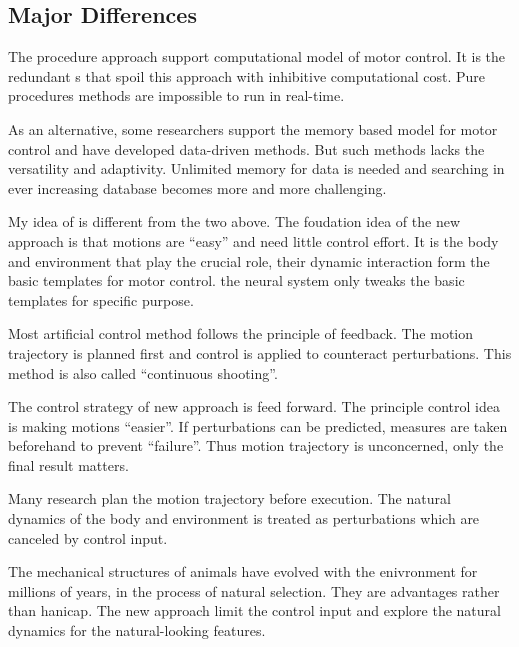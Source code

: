 \subsection{Major Differences}
\begin{itemize}
The procedure approach support computational model of motor control.
It is the redundant {\dof}s that spoil this approach  with inhibitive computational cost.
Pure procedures methods are impossible to run in real-time.

As an alternative, some researchers support the memory based model for motor control and have developed data-driven methods.
But such methods lacks the versatility and adaptivity.
Unlimited memory for data is needed and searching in ever increasing database becomes more and more challenging.

My idea of is different from the two above.
The foudation idea of the new approach is that motions are ``easy'' and need little control effort.
It is the body and environment that play the crucial role, their dynamic interaction form the basic templates for motor control.
the neural system only tweaks the basic templates for specific purpose.



 
 
	
Most artificial control method follows the principle of feedback.
The motion trajectory is planned first and control is applied to counteract perturbations.
This method is also called ``continuous shooting''.


The control strategy of new approach is feed forward.
The principle control idea is making motions ``easier''.
If perturbations can be predicted, measures are taken beforehand to prevent ``failure''.
Thus motion trajectory is unconcerned, only the final result matters.


Many \cms research plan the motion trajectory before execution.
The natural dynamics of the body and environment is treated as perturbations which are canceled by control input.


The mechanical structures of animals have evolved with the enivronment for millions of years, in the process of natural selection.
They are advantages rather than hanicap. 
The new approach limit the control input and explore the natural dynamics for the natural-looking features.
\end{itemize}


